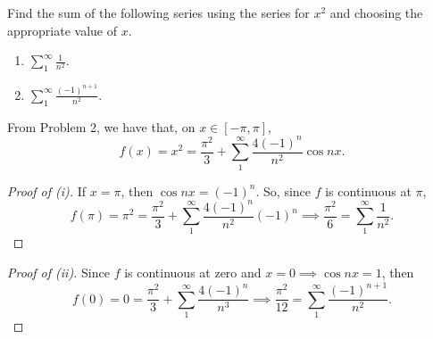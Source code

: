 \documentclass[../hw6]{subfiles}
\begin{document}
\begin{problem}
Find the sum of the following series using the series for $x^2$ and choosing the appropriate value of $x$.
\begin{enumerate}
	\item $\sum_{1}^{\infty} \frac{1}{n^2}$.
	\item $\sum_{1}^{\infty} \frac{(-1)^{n+1}}{n^2}$.
\end{enumerate}
\end{problem}
From Problem 2, we have that, on $x \in [-\pi,\pi]$, \[
	f(x)=x^2=\frac{\pi^2}{3}+\sum_{1}^{\infty} \frac{4(-1)^n}{n^2}\cos{nx}
	.\]
\begin{proof}[Proof of (i)]
	If $x=\pi$, then $\cos{nx}=(-1)^n$.
	So, since $f$ is continuous at  $\pi$,  \[
		f(\pi)=\pi^2=\frac{\pi^2}{3}+\sum_{1}^{\infty} \frac{4(-1)^n}{n^2}(-1)^n \implies \frac{\pi^2}{6} = \sum_{1}^{\infty} \frac{1}{n^2}
		.\]
\end{proof}
\begin{proof}[Proof of (ii)]
	Since $f$ is continuous at zero and $x=0\implies \cos{nx}=1$, then \[
		f(0)=0 = \frac{\pi^2}{3}+\sum_{1}^{\infty} \frac{4(-1)^n}{n^3} \implies \frac{\pi^2}{12}=\sum_{1}^{\infty} \frac{(-1)^{n+1}}{n^2}
		.\]
\end{proof}
\end{document}
